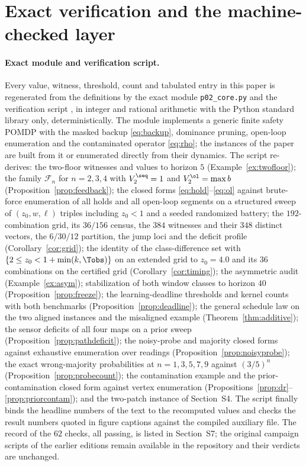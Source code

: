 \section{Exact verification and the machine-checked layer}\label{sec:verification}

\paragraph{Exact module and verification script.}
Every value, witness, threshold, count and tabulated entry in this paper is regenerated from the definitions by the exact module \texttt{p02\_core.py} and the verification script , in integer and rational arithmetic with the Python standard library only, deterministically. The module implements a generic finite safety POMDP with the masked backup \eqref{eq:backup}, dominance pruning, open-loop enumeration and the contaminated operator \eqref{eq:rho}; the instances of the paper are built from it or enumerated directly from their dynamics. The script re-derives: the two-floor witnesses and values to horizon $5$ (Example~\ref{ex:twofloor}); the family $\mathcal F_n$ for $n=2,3,4$ with $V^{\seq}_2=1$ and $V^{\ol}_2=\max b$ (Proposition~\ref{prop:feedback}); the closed forms \eqref{eq:hold}--\eqref{eq:ol} against brute-force enumeration of all holds and all open-loop segments on a structured sweep of $(z_0,w,\ell)$ triples including $z_0<1$ and a seeded randomized battery; the $192$-combination grid, its $36/156$ census, the $384$ witnesses and their $348$ distinct vectors, the $6/30/12$ partition, the jump loci and the deficit profile (Corollary~\ref{cor:grid}); the identity of the class-difference set with $\{2\le z_0<1+\min(k,\Tobs)\}$ on an extended grid to $z_0=4.0$ and its $36$ combinations on the certified grid (Corollary~\ref{cor:timing}); the asymmetric audit (Example~\ref{ex:asym}); stabilization of both window classes to horizon $40$ (Proposition~\ref{prop:freeze}); the learning-deadline thresholds and kernel counts with both benchmarks (Proposition~\ref{prop:deadline}); the general schedule law on the two aligned instances and the misaligned example (Theorem~\ref{thm:additive}); the sensor deficits of all four maps on a prior sweep (Proposition~\ref{prop:pathdeficit}); the noisy-probe and majority closed forms against exhaustive enumeration over readings (Proposition~\ref{prop:noisyprobe}); the exact wrong-majority probabilities at $n=1,3,5,7,9$ against $(3/5)^{n}$ (Proposition~\ref{prop:probecount}); the contamination example and the prior-contamination closed form against vertex enumeration (Propositions~\ref{prop:dr}--\ref{prop:priorcontam}); and the two-patch instance of Section~S4. The script finally binds the headline numbers of the text to the recomputed values and checks the result numbers quoted in figure captions against the compiled auxiliary file. The record of the $62$ checks, all passing, is listed in Section~S7; the original campaign scripts of the earlier editions remain available in the repository and their verdicts are unchanged.

